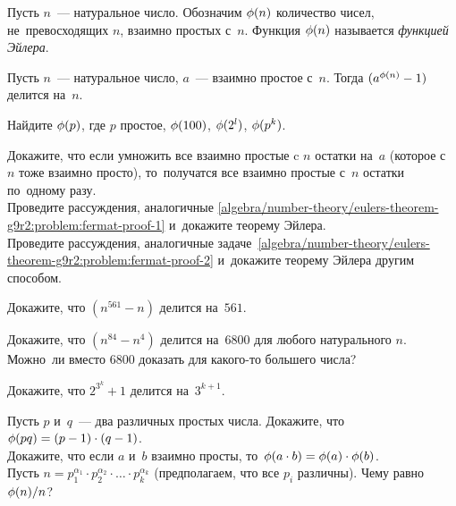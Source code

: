 Пусть $n$~--- натуральное число.
Обозначим $\mathrm{\phi}(n)$ количество чисел, не~превосходящих $n$, взаимно простых
с~$n$.
Функция $\mathrm{\phi}(n)$ называется \emph{функцией Эйлера}.

Пусть $n$~--- натуральное число, $a$~--- взаимно простое с~$n$.
Тогда $(a^{\mathrm{\phi}(n)} - 1)$ делится на~$n$.

\begin{problems}

\item
Найдите $\mathrm{\phi}(p)$, где $p$ простое, $\mathrm{\phi}(100)$, $\mathrm{\phi}(2^l)$,
$\mathrm{\phi}(p^k)$.

\item
\subproblem
Докажите, что если умножить все взаимно простые c $n$ остатки на~$a$
(которое с~$n$ тоже взаимно просто), то~получатся все взаимно простые с~$n$
остатки по~одному разу.
\\
\subproblem
Проведите рассуждения, аналогичные
\ref{algebra/number-theory/eulers-theorem-g9r2:problem:fermat-proof-1}
и~докажите теорему Эйлера.
\\
\subproblem
Проведите рассуждения, аналогичные
задаче~\ref{algebra/number-theory/eulers-theorem-g9r2:problem:fermat-proof-2}
и~докажите теорему Эйлера другим способом.

\item
Докажите, что $(n^{561} - n)$ делится на~$561$.

\item
\subproblem
Докажите, что $(n^{84} - n^4)$ делится на~6800 для любого натурального $n$.
\\
\subproblem
Можно~ли вместо 6800 доказать для какого-то большего числа?

\item
Докажите, что $2^{3^k} + 1$ делится на~$3^{k+1}$.

\item
\subproblem
Пусть $p$ и~$q$~--- два различных простых числа.
Докажите, что $\mathrm{\phi}(pq) = (p - 1) \cdot (q - 1)$.
\\
\subproblem
Докажите, что если $a$ и~$b$ взаимно просты,
то~$\mathrm{\phi}(a \cdot b) = \mathrm{\phi}(a) \cdot \mathrm{\phi}(b)$.
\\
\subproblem
Пусть
\(
    n
=
    p_1^{\alpha_1} \cdot p_2^{\alpha_2} \cdot \ldots \cdot p_k^{\alpha_k}
\)
(предполагаем, что все $p_i$ различны).
Чему равно $\mathrm{\phi}(n) / n$?

\end{problems}

\endgroup %

